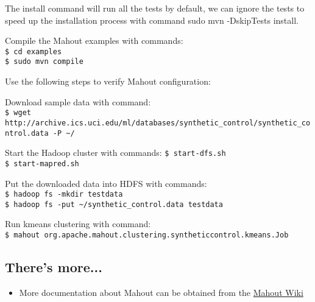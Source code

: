 The install command will run all the tests by default, we can ignore the tests to speed up the installation process with command sudo mvn -DskipTests install.

Compile the Mahout examples with commands: \\
\verb|$ cd examples| \\
\verb|$ sudo mvn compile|

Use the following steps to verify Mahout configuration:

Download sample data with command: \\
\verb|$ wget http://archive.ics.uci.edu/ml/databases/synthetic_control/synthetic_control.data -P ~/|

Start the Hadoop cluster with commands:
\verb|$ start-dfs.sh| \\
\verb|$ start-mapred.sh|

Put the downloaded data into HDFS with commands: \\
\verb|$ hadoop fs -mkdir testdata| \\
\verb|$ hadoop fs -put ~/synthetic_control.data testdata|

Run kmeans clustering with command: \\
\verb|$ mahout org.apache.mahout.clustering.syntheticcontrol.kmeans.Job|

\subsection*{There's more...}
\begin{itemize}
  \item More documentation about Mahout can be obtained from the \href{https://cwiki.apache.org/confluence/display/MAHOUT/Mahout+Wiki}{Mahout Wiki}
\end{itemize}
